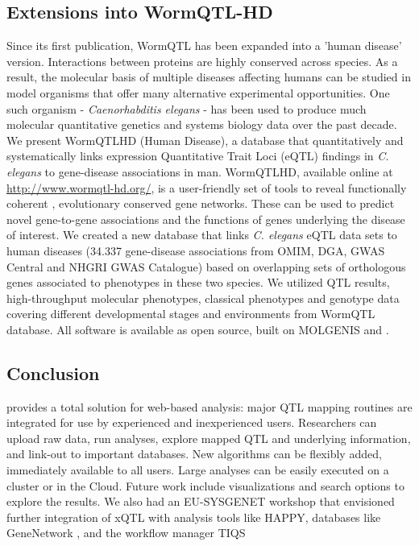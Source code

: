 \subsection{Extensions into WormQTL-HD}
Since its first publication, WormQTL has been expanded into a 'human disease' version. Interactions 
between proteins are highly conserved across species. As a result, the molecular basis 
of multiple diseases affecting humans can be studied in model organisms that offer many alternative 
experimental opportunities. One such organism - \emph{Caenorhabditis elegans} - has been used to produce much 
molecular quantitative genetics and systems biology data over the past decade. We present WormQTLHD 
(Human Disease), a database that quantitatively and systematically links expression Quantitative 
Trait Loci (eQTL) findings in \emph{C. elegans} to gene-disease associations in man. WormQTLHD, available 
online at \url{http://www.wormqtl-hd.org/}, is a user-friendly set of tools to reveal functionally coherent
, evolutionary conserved gene networks. These can be used to predict novel gene-to-gene associations 
and the functions of genes underlying the disease of interest. We created a new database that links 
\emph{C. elegans} eQTL data sets to human diseases (34.337 gene-disease associations from OMIM, DGA, GWAS 
Central and NHGRI GWAS Catalogue) based on overlapping sets of orthologous genes associated to 
phenotypes in these two species. We utilized QTL results, high-throughput molecular phenotypes, 
classical phenotypes and genotype data covering different developmental stages and environments from 
WormQTL database. All software is available as open source, built on MOLGENIS and \xqtlwb. 

\subsection{Conclusion}
\xqtlwb provides a total solution for web-based analysis: major QTL mapping routines are 
integrated for use by experienced and inexperienced users. Researchers can upload raw data, run 
analyses, explore mapped QTL and underlying information, and link-out to important databases. New 
algorithms can be flexibly added, immediately available to all users. Large analyses can be easily 
executed on a cluster or in the Cloud. Future work include visualizations and search options to 
explore the results. We also had an EU-SYSGENET workshop that envisioned further integration of 
xQTL with analysis tools like HAPPY, databases like GeneNetwork \cite{GeneNetwork:2004}, and the 
workflow manager TIQS \cite{Durrant:2012}


